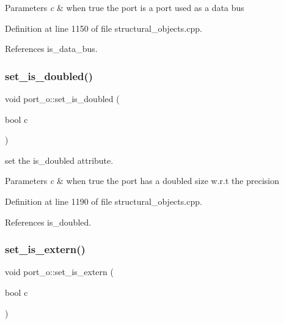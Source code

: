 \begin{DoxyParams}{Parameters}
{\em c} & when true the port is a port used as a data bus \\
\hline
\end{DoxyParams}


Definition at line 1150 of file structural\+\_\+objects.\+cpp.



References is\+\_\+data\+\_\+bus.

\mbox{\label{structport__o_a8105ee88db27373d643966b54540cb73}} 
\subsubsection{\texorpdfstring{set\+\_\+is\+\_\+doubled()}{set\_is\_doubled()}}
{\footnotesize\ttfamily void port\+\_\+o\+::set\+\_\+is\+\_\+doubled (\begin{DoxyParamCaption}\item[{bool}]{c }\end{DoxyParamCaption})}



set the is\+\_\+doubled attribute. 


\begin{DoxyParams}{Parameters}
{\em c} & when true the port has a doubled size w.\+r.\+t the precision \\
\hline
\end{DoxyParams}


Definition at line 1190 of file structural\+\_\+objects.\+cpp.



References is\+\_\+doubled.

\mbox{\label{structport__o_ae7d22e9b0c83431ae0ae37e745df0678}} 
\subsubsection{\texorpdfstring{set\+\_\+is\+\_\+extern()}{set\_is\_extern()}}
{\footnotesize\ttfamily void port\+\_\+o\+::set\+\_\+is\+\_\+extern (\begin{DoxyParamCaption}\item[{bool}]{c }\end{DoxyParamCaption})}



